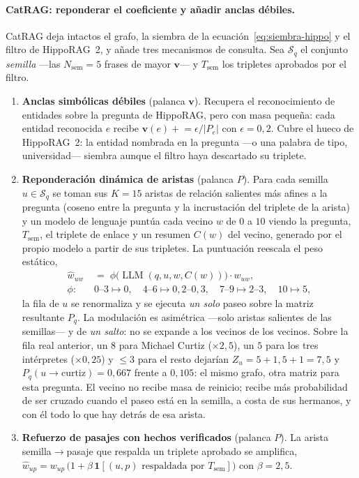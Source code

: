 \documentclass[11pt,a4paper]{article}
\newcommand{\hippo}{HippoRAG~2}
\newcommand{\op}[1]{\operatorname{#1}}
\begin{document}
\paragraph{CatRAG: reponderar el coeficiente y añadir anclas débiles.}
CatRAG deja intactos el grafo, la siembra de la
ecuación~\eqref{eq:siembra-hippo} y el filtro de \hippo{}, y añade tres
mecanismos de consulta. Sea $\mathcal{S}_q$ el conjunto \emph{semilla}
---las $N_{\text{sem}}=5$ frases de mayor $\mathbf{v}$--- y
$T_{\text{sem}}$ los tripletes aprobados por el filtro.
\begin{enumerate}[leftmargin=1.6em, itemsep=2pt]
\item \textbf{Anclas simbólicas débiles} (palanca $\mathbf{v}$). Recupera
  el reconocimiento de entidades sobre la pregunta de HippoRAG, pero con
  masa pequeña: cada entidad reconocida $e$ recibe
  $\mathbf{v}(e) \mathrel{+}= \epsilon/|P_e|$ con $\epsilon=0{,}2$. Cubre
  el hueco de \hippo{}: la entidad nombrada en la pregunta ---o una
  palabra de tipo, \guillemotleft{}universidad\guillemotright{}--- siembra aunque el filtro haya
  descartado su triplete.
\item \textbf{Reponderación dinámica de aristas} (palanca $P$). Para cada
  semilla $u\in\mathcal{S}_q$ se toman sus $K=15$ aristas de relación
  salientes más afines a la pregunta (coseno entre la pregunta y la
  incrustación del triplete de la arista) y un modelo de lenguaje puntúa
  cada vecino $w$ de $0$ a $10$ viendo la pregunta, $T_{\text{sem}}$, el
  triplete de enlace y un resumen $C(w)$ del vecino, generado por el
  propio modelo a partir de sus tripletes. La puntuación reescala el peso
  estático,
  \begin{equation}
  \begin{aligned}
  \hat{w}_{uw} \;&=\; \phi\bigl(\op{LLM}(q,u,w,C(w))\bigr)\cdot w_{uw},\\
  \phi:\ &0\text{--}3\mapsto 0,\quad 4\text{--}6\mapsto 0{,}2\text{--}0{,}3,\quad
  7\text{--}9\mapsto 2\text{--}3,\quad 10\mapsto 5,
  \end{aligned}
  \label{eq:catrag-aristas}
  \end{equation}
  la fila de $u$ se renormaliza y se ejecuta \emph{un solo} paseo sobre la
  matriz resultante $P_q$. La modulación es asimétrica ---solo aristas
  salientes de las semillas--- y de \emph{un salto}: no se expande a los
  vecinos de los vecinos. Sobre la fila real anterior, un $8$ para
  Michael Curtiz ($\times 2{,}5$), un $5$ para los tres intérpretes
  ($\times 0{,}25$) y $\le 3$ para el resto dejarían
  $Z_u = 5 + 1{,}5 + 1 = 7{,}5$ y $P_q(u\to\text{curtiz}) = 0{,}667$
  frente a $0{,}105$: el mismo grafo, otra matriz para esta pregunta. El
  vecino no recibe masa de reinicio; recibe más probabilidad de ser
  cruzado cuando el paseo está en la semilla, a costa de sus hermanos, y
  con él todo lo que hay detrás de esa arista.
\item \textbf{Refuerzo de pasajes con hechos verificados} (palanca $P$).
  La arista semilla$\to$pasaje que respalda un triplete aprobado se
  amplifica,
  $\hat{w}_{up} = w_{up}\,\bigl(1+\beta\,\mathbf{1}[(u,p)\text{ respaldada
  por } T_{\text{sem}}]\bigr)$ con $\beta=2{,}5$.
\end{enumerate}
\end{document}

